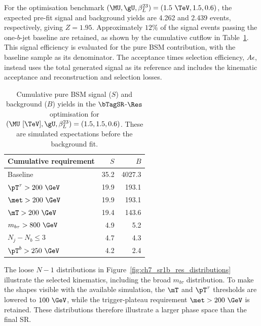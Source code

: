 For the optimisation benchmark $(\MU,\gU,\beta_L^{23})=(1.5~\TeV,1.5,0.6)$, the expected pre-fit signal and background yields are 4.262 and 2.439 events, respectively, giving $Z=1.95$.
Approximately $12\%$ of the signal events passing the one-$b$-jet baseline are retained, as shown by the cumulative cutflow in Table~\ref{tab:ch7_cutflow_res}.
This signal efficiency is evaluated for the pure BSM contribution, with the baseline sample as its denominator.
The acceptance times selection efficiency, $A\epsilon$, instead uses the total generated signal as its reference and includes the kinematic acceptance and reconstruction and selection losses.

\begin{table}[htbp]
    \centering
    \small
    \caption{Cumulative pure BSM signal ($S$) and background ($B$) yields in the $\bTagSR$-$\Res$ optimisation for $(\MU~[\TeV],\gU,\beta_L^{23})=(1.5,1.5,0.6)$. These are simulated expectations before the background fit.}
    \label{tab:ch7_cutflow_res}
    \begin{tabular}{lrr}
        \toprule
        Cumulative requirement & $S$ & $B$ \\
        \midrule
        Baseline & 35.2 & 4027.3 \\
        $\pT^\tau>200~\GeV$ & 19.9 & 193.1 \\
        $\met>200~\GeV$ & 19.9 & 193.1 \\
        $\mT>200~\GeV$ & 19.4 & 143.6 \\
        $m_{b\tau}>800~\GeV$ & 4.9 & 5.2 \\
        $N_j-N_b\leq3$ & 4.7 & 4.3 \\
        $\pT^b>250~\GeV$ & 4.2 & 2.4 \\
        \bottomrule
    \end{tabular}
\end{table}

The loose $N-1$ distributions in Figure~\ref{fig:ch7_sr1b_res_distributions} illustrate the selected kinematics, including the broad $m_{b\tau}$ distribution.
To make the shapes visible with the available simulation, the $\mT$ and $\pT^\tau$ thresholds are lowered to $100~\GeV$, while the trigger-plateau requirement $\met>200~\GeV$ is retained.
These distributions therefore illustrate a larger phase space than the final SR.

